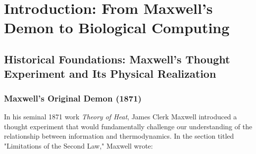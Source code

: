 \documentclass[11pt,a4paper]{article}
\begin{document}
\begin{abstract}
This work establishes biological systems not as passive biochemical networks but as programmable oscillatory computers with architectures fundamentally superior to silicon: O(1) computational complexity via categorical filtering ($\sim10^6$ equivalence classes compressed instantaneously), self-repair through environmental noise, consciousness interfacing enabling software-to-thought compilation, multi-scale parallelism across eight hierarchical frequency bands ($10^{-15}$ to $10^3$ Hz), and cross-domain programmability allowing acoustic/thermal/optical/electrical interoperability. Applications demonstrated include programmable therapeutic circuits for chronic disease management, synthetic biology design through hardware-independent S-entropy compilation, consciousness-controlled neural prosthetics, biological cryptography exploiting $10^{31}$ states/cm$^3$ memory density, and living computational substrates for artificial general intelligence through self-referential BMD networks. The framework transforms biology from target of intervention into platform for computation, establishes circuit design and metabolic engineering as identical disciplines unified by S-coordinate transformation, and proves consciousness directly programs matter through information catalysis measurable in existing biological systems.
\end{abstract}

\clearpage
\tableofcontents
\clearpage

\section{Introduction: From Maxwell's Demon to Biological Computing}

\subsection{Historical Foundations: Maxwell's Thought Experiment and Its Physical Realization}

\subsubsection{Maxwell's Original Demon (1871)}

In his seminal 1871 work \textit{Theory of Heat}, James Clerk Maxwell introduced a thought experiment that would fundamentally challenge our understanding of the relationship between information and thermodynamics\cite{maxwell1871theory}. In the section titled "Limitations of the Second Law," Maxwell wrote:
\end{document}
